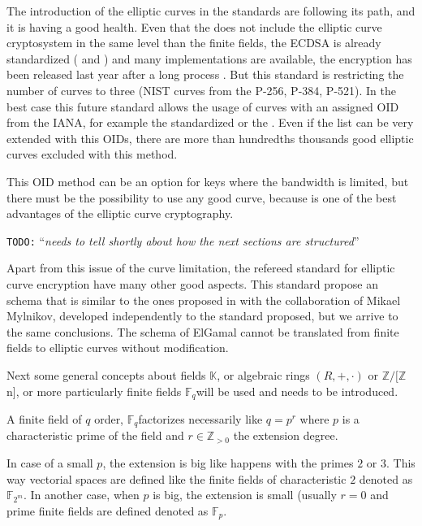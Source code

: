 \documentclass[10pt,a4paper,twoside]{llncs}
\newcommand{\todo}[1]{\texttt{\color{red}TODO:} ``\emph{#1}''}
\newcommand{\K}{\ensuremath{\mathbb{K}}}%
\newcommand{\Fp}{\ensuremath{\mathbb{F}_p}}%
\newcommand{\Fm}{\ensuremath{\mathbb{F}_{2^m}}}%
\newcommand{\Fq}{\ensuremath{\mathbb{F}_q}}%
\newcommand{\Zn}[1]{\ensuremath{\mathbb{Z}/#1\mathbb{Z}}}%
\begin{document}
The introduction of the elliptic curves in the standards are following its path, and it is having a good health. Even that the \cite{rfc4880} does not include the elliptic curve cryptosystem in the same level than the finite fields, the ECDSA is already standardized (\cite{NIST186-3} and \cite{rfc5832}) and many implementations are available, the encryption has been released last year after a long process \cite{rfc6637}. But this standard is restricting the number of curves to three (NIST curves from the \cite{NIST186-3} P-256, P-384, P-521). In the best case this future standard allows the usage of curves with an assigned OID from the IANA, for example the \cite{brainpool} standardized or the \cite{sec2}. Even if the list can be very extended with this OIDs, there are more than hundredths thousands good elliptic curves excluded with this method.

This OID method can be an option for keys where the bandwidth is limited, but there must be the possibility to use any good curve, because is one of the best advantages of the elliptic curve cryptography.

\todo{needs to tell shortly about how the next sections are structured}

Apart from this issue of the curve limitation, the refereed standard for elliptic curve encryption have many other good aspects. This standard propose an schema that is similar to the ones proposed in \cite{BM06} with the collaboration of Mikael Mylnikov, developed independently to the standard proposed, but we arrive to the same conclusions. The schema of ElGamal cannot be translated from finite fields to elliptic curves without modification.

Next some general concepts about fields \K, or algebraic rings $(R,+,\cdot)$ or \Zn[n], or more particularly finite fields \Fq will be used and needs to be introduced.

\begin{definition}\label{def:cf}
 A finite field of $q$ order, \Fq \;factorizes necessarily like $q=p^r$ where $p$ is a characteristic prime of the field and $r \in \mathbb{Z}_{>0}$ the extension degree.
\end{definition}

In case of a small $p$, the extension is big like happens with the primes $2$ or $3$. This way vectorial spaces are defined like the finite fields of characteristic $2$ denoted as \Fm. In another case, when $p$ is big, the extension is small (usually $r=0$ and prime finite fields are defined denoted as \Fp.
\end{document}
